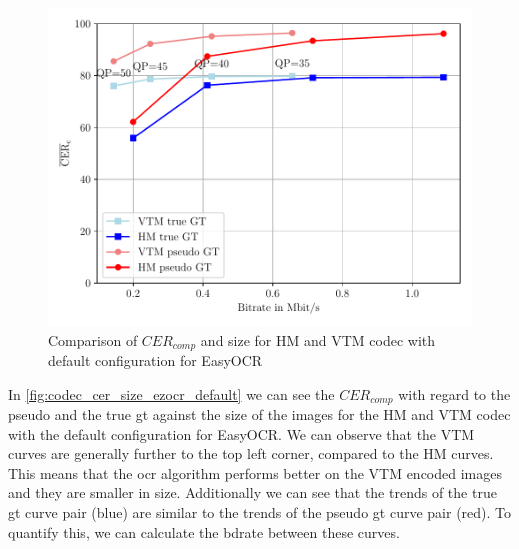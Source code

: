 \begin{figure}[h]
    \centering
    \includegraphics[width=\textwidth]{../images/analyze/codec_cer_size_ezocr_default.pdf}
    \caption{Comparison of $CER_{comp}$ and size for HM and VTM codec with default configuration for EasyOCR}
    \label{fig:codec_cer_size_ezocr_default}
\end{figure}

In \autoref{fig:codec_cer_size_ezocr_default} we can see the $CER_{comp}$ with regard to the pseudo and the true \gls{gt} against the size of the images for the HM and VTM codec with the default configuration for EasyOCR.
We can observe that the VTM curves are generally further to the top left corner, compared to the HM curves.
This means that the \gls{ocr} algorithm performs better on the VTM encoded images and they are smaller in size.
Additionally we can see that the trends of the true \gls{gt} curve pair (blue) are similar to the trends of the pseudo \gls{gt} curve pair (red).
To quantify this, we can calculate the \gls{bdrate} between these curves.

